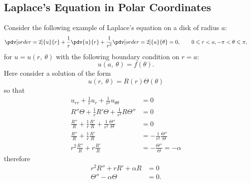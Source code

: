\documentclass{article}
\begin{document}
\subsection{Laplace's Equation in Polar Coordinates}
Consider the following example of Laplace's equation on a disk of
radius \(a\):
\begin{equation*}
    \pdv[order=2]{u}{r} + \frac{1}{r} \pdv{u}{r} + \frac{1}{r^2} \pdv[order=2]{u}{\theta} = 0, \quad\quad 0 \leqslant r < a, -\pi < \theta \leqslant \pi,
\end{equation*}
for \(u = u\left( r,\: \theta \right)\) with the following boundary condition on \(r = a\):
\begin{equation*}
    u\left( a,\: \theta \right) = f\left( \theta \right).
\end{equation*}
Here consider a solution of the form
\begin{equation*}
    u\left( r,\: \theta \right) = R\left( r \right) \Theta\left( \theta \right)
\end{equation*}
so that
\begin{align*}
    u_{r r} + \frac{1}{r} u_r + \frac{1}{r^2} u_{\theta\theta}                       & = 0                                      \\
    R''\Theta + \frac{1}{r} R'\Theta + \frac{1}{r^2} R\Theta''                       & = 0                                      \\
    \frac{R''}{R} + \frac{1}{r} \frac{R'}{R} + \frac{1}{r^2} \frac{\Theta''}{\Theta} & = 0                                      \\
    \frac{R''}{R} + \frac{1}{r} \frac{R'}{R}                                         & = -\frac{1}{r^2} \frac{\Theta''}{\Theta} \\
    r^2 \frac{R''}{R} + r \frac{R'}{R}                                               & = -\frac{\Theta''}{\Theta} = - \alpha
\end{align*}
therefore
\begin{align*}
    r^2 R'' + r R' + \alpha R & = 0  \\
    \Theta'' - \alpha \Theta  & = 0.
\end{align*}
\end{document}
